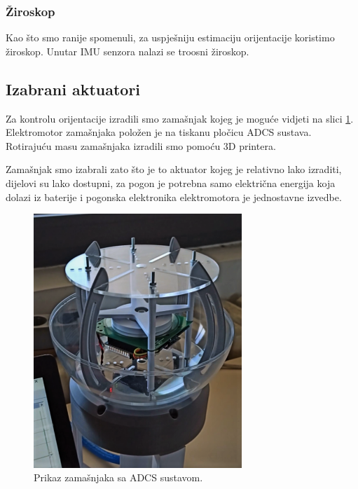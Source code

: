 \documentclass[times, utf8, diplomski, numeric]{templates/template}
\begin{document}
{{{            \subsubsection{Žiroskop}{
                Kao što smo ranije spomenuli, za uspješniju estimaciju orijentacije koristimo žiroskop. Unutar IMU senzora nalazi se troosni žiroskop.
            }
        }

        \subsection{Izabrani aktuatori}{
            Za kontrolu orijentacije izradili smo zamašnjak kojeg je moguće vidjeti na slici \ref{fig:zamasnjak}. Elektromotor zamašnjaka položen je na tiskanu pločicu ADCS sustava. Rotirajuću masu zamašnjaka izradili smo pomoću 3D printera. 

            Zamašnjak smo izabrali zato što je to aktuator kojeg je relativno lako izraditi, dijelovi su lako dostupni, za pogon je potrebna samo električna energija koja dolazi iz baterije i pogonska elektronika elektromotora je jednostavne izvedbe.
 
            \begin{figure}[htb]
            \centering
            \includegraphics[width=0.7\textwidth]{images/zamasnjak.png}
            \caption{Prikaz zamašnjaka sa ADCS sustavom.}
            \label{fig:zamasnjak}
            \end{figure}
        }
    }
}
\end{document}
